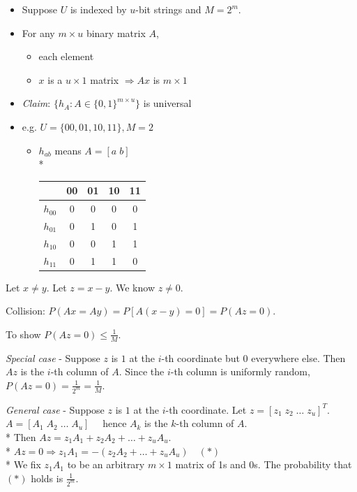 \documentclass[10pt, landscape]{article}
\newcommand{\Mod}[1]{\ (\mathrm{mod}\ #1)}
\begin{document}
\begin{multicols*}{4}
  \begin{itemize}
    \item Suppose $U$ is indexed by $u$-bit strings and $M = 2^m$. 
    \item For any $m \times u$ binary matrix $A$, \ildefinition{$h_A(x) = Ax \Mod 2$ }
      \begin{itemize}
        \item each element 
        \item $x$ is a $u \times 1$ matrix $\Rightarrow Ax$ is $m \times 1$
      \end{itemize}
    \item \textit{Claim}: $\{h_A:A \in \{0, 1\}^{m \times u}\}$ is universal
    \item e.g. $U = \{00, 01, 10, 11\}, M = 2$ 
      \begin{itemize}
        \item $h_{ab}$ means $A = [a\; b]$
          \\* {\begin{tabular}
              {ccccc}
              \rowcolor{cyan!10} 
              \hline
              \, & 00 & 01 & 10 & 11 \\\hline
              $h_{00}$ & 0 & 0 & 0 & 0 \\
              $h_{01}$ & 0 & 1 & 0 & 1 \\
              $h_{10}$ & 0 & 0 & 1 & 1 \\
              $h_{11}$ & 0 & 1 & 1 & 0 \\\hline
            \end{tabular}
          }
      \end{itemize}
  \end{itemize}

  \begin{niceproof}
    Let $x \neq y$. Let $z = x - y$. We know $z \neq 0$. 

    Collision: $\scriptstyle P(Ax = Ay) = P[A(x-y) = 0] = P(Az = 0)$.

    To show $P(Az = 0) \leq \frac{1}{M} $.

    \textit{Special case} - Suppose $z$ is $1$ at the $i$-th coordinate but 0 everywhere else. Then $Az$ is the $i$-th column of $A$.
    Since the $i$-th column is uniformly random, $P(Az = 0) = \frac{1}{2^m} = \frac{1}{M} $.

    \textit{General case} - Suppose $z$ is $1$ at the $i$-th coordinate. Let $z = [z_1 \; z_2 \; \dots \; z_u]^T$. 
    $A = [A_1 \; A_2 \; \dots \; A_u] \quad$ hence $A_k$ is the $k$-th column of $A$.
    \\* Then $Az = z_1 A_1 + z_2 A_2 + \dots + z_u A_u$.
    \\* $Az = 0 \Rightarrow z_1 A_1 = -(z_2 A_2 + \dots + z_u A_u) \quad(*)$
    \\* We fix $z_1A_1$ to be an arbitrary $m \times 1$ matrix of 1s and 0s. The probability that $(*)$ holds is $ \frac{1}{2^m} $.
  \end{niceproof}


\end{multicols*}
\end{document}
